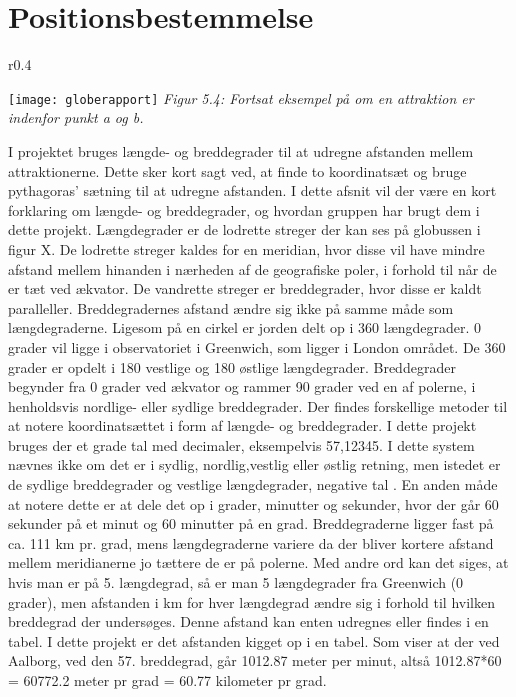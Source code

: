 \section{Positionsbestemmelse}
\begin{wrapfigure}{r}{0.4\textwidth}
	\vspace{-20pt}
	\begin{center}
		\texttt{[image: globerapport]} \newline
		\textit{Figur 5.4: Fortsat eksempel på om en attraktion er indenfor punkt a og b.}\newline
	\end{center}
	\vspace{-30pt}
\end{wrapfigure}
I projektet bruges længde- og breddegrader til at udregne afstanden mellem attraktionerne. Dette sker kort sagt ved, at finde to koordinatsæt og bruge pythagoras’ sætning til at udregne afstanden. I dette afsnit vil der være en kort forklaring om længde- og breddegrader, og hvordan gruppen har brugt dem i dette projekt.\newline
Længdegrader er de lodrette streger der kan ses på globussen i figur X. De lodrette streger kaldes for en meridian, hvor disse vil have mindre afstand mellem hinanden i nærheden af de geografiske poler, i forhold til når de er tæt ved ækvator. De vandrette streger er breddegrader, hvor disse er kaldt paralleller. Breddegradernes afstand ændre sig ikke på samme måde som længdegraderne. \citep{PM} \newline
Ligesom på en cirkel er jorden delt op i 360 længdegrader. 0 grader vil ligge i observatoriet i Greenwich, som ligger i London området. De 360 grader er opdelt i 180 vestlige og 180 østlige længdegrader. Breddegrader begynder fra 0 grader ved ækvator og rammer 90 grader ved en af polerne, i henholdsvis nordlige- eller sydlige breddegrader. \citep{PM}\newline
Der findes forskellige metoder til at notere koordinatsættet i form af længde- og breddegrader. I dette projekt bruges der et grade tal med decimaler, eksempelvis 57,12345. I dette system nævnes ikke om det er i sydlig, nordlig,vestlig eller østlig retning, men istedet er de sydlige breddegrader og vestlige længdegrader, negative tal . En anden måde at notere dette er at dele det op i grader, minutter og sekunder, hvor der går 60 sekunder på et minut og 60 minutter på en grad. Breddegraderne ligger fast på ca. 111 km pr. grad, mens længdegraderne variere da der bliver kortere afstand mellem meridianerne jo tættere de er på polerne. Med andre ord kan det siges, at hvis man er på 5. længdegrad, så er man 5 længdegrader fra Greenwich (0 grader), men afstanden i km for hver længdegrad ændre sig i forhold til hvilken breddegrad der undersøges. Denne afstand kan enten udregnes eller findes i en tabel. I dette projekt er det afstanden kigget op i en tabel\citep{Earth}. Som viser at der ved Aalborg, ved den 57. breddegrad, går 1012.87 meter per minut, altså 1012.87*60 =  60772.2 meter pr grad = 60.77 kilometer pr grad.\citep{PM}

